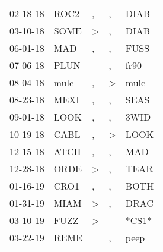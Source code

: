 \begin{supertabular}{p{0.07\textwidth}p{0.06\textwidth}p{0.02\textwidth}p{0.02\textwidth}p{0.06\textwidth}}
          02-18-18\textsuperscript{} &           ROC2\textsuperscript{} &                , &                , &           DIAB\textsuperscript{} \\
          03-10-18\textsuperscript{} &           SOME\textsuperscript{} &     \textgreater &                , &           DIAB\textsuperscript{} \\
          06-01-18\textsuperscript{} &            MAD\textsuperscript{} &                , &                , &           FUSS\textsuperscript{} \\
          07-06-18\textsuperscript{} &           PLUN\textsuperscript{} &                  &                , &           fr90\textsuperscript{} \\
          08-04-18\textsuperscript{} &           mulc\textsuperscript{} &                , &     \textgreater &           mulc\textsuperscript{} \\
          08-23-18\textsuperscript{} &           MEXI\textsuperscript{} &                , &                , &           SEAS\textsuperscript{} \\
          09-01-18\textsuperscript{} &           LOOK\textsuperscript{} &                , &                , &           3WID\textsuperscript{} \\
          10-19-18\textsuperscript{} &           CABL\textsuperscript{} &                , &     \textgreater &           LOOK\textsuperscript{} \\
          12-15-18\textsuperscript{} &           ATCH\textsuperscript{} &                , &                , &            MAD\textsuperscript{} \\
          12-28-18\textsuperscript{} &           ORDE\textsuperscript{} &     \textgreater &                , &           TEAR\textsuperscript{} \\
          01-16-19\textsuperscript{} &           CRO1\textsuperscript{} &                , &                , &           BOTH\textsuperscript{} \\
          01-31-19\textsuperscript{} &           MIAM\textsuperscript{} &     \textgreater &                , &           DRAC\textsuperscript{} \\
          03-10-19\textsuperscript{} &           FUZZ\textsuperscript{} &     \textgreater &                  &                            *CS1* \\
          03-22-19\textsuperscript{} &           REME\textsuperscript{} &                  &                , &           peep\textsuperscript{} \\

\end{supertabular}
